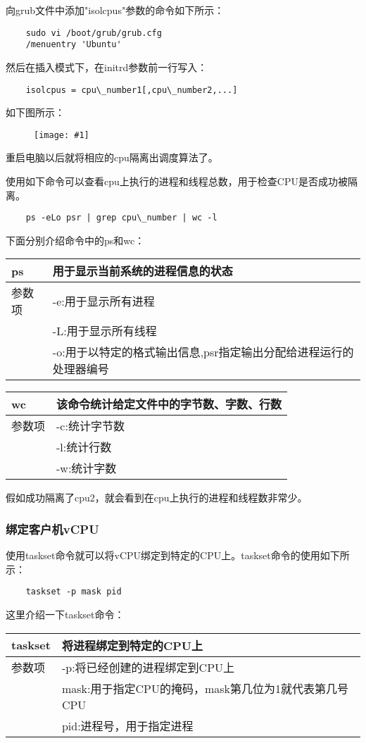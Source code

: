 \documentclass[a4paper,left=2.5cm,right=2.5cm,11pt]{article}
\newcommand{\fic}[1]{\begin{figure}[H]
		\center
		\texttt{[image: \#1]}
	\end{figure}}
\newcommand{\interval}{\vspace{0.5em}}
\newcommand{\tablestart}{
	\interval
	\begin{longtable}{p{2cm}p{10cm}}
	\hline}
\newcommand{\tableend}{
	\hline
	\end{longtable}
	\interval}
\begin{document}
	向grub文件中添加"isolcpus"参数的命令如下所示：
	\begin{lstlisting}
	sudo vi /boot/grub/grub.cfg
	/menuentry 'Ubuntu'
	\end{lstlisting}
	
	然后在插入模式下，在initrd参数前一行写入：
	\begin{lstlisting}
	isolcpus = cpu\_number1[,cpu\_number2,...]
	\end{lstlisting}

	如下图所示：
	\fic{2.png}

	重启电脑以后就将相应的cpu隔离出调度算法了。\par

	使用如下命令可以查看cpu上执行的进程和线程总数，用于检查CPU是否成功被隔离。

	\begin{lstlisting}
	ps -eLo psr | grep cpu\_number | wc -l
	\end{lstlisting}

	下面分别介绍命令中的ps和wc：
	\tablestart
	ps & 用于显示当前系统的进程信息的状态\\
	\hline
	参数项 & -e:用于显示所有进程 \\
		& -L:用于显示所有线程 \\
		& -o:用于以特定的格式输出信息,psr指定输出分配给进程运行的处理器编号 \\
	\tableend

	\tablestart
	wc & 该命令统计给定文件中的字节数、字数、行数 \\
	\hline
	参数项 & -c:统计字节数 \\
		  & -l:统计行数 \\
		  & -w:统计字数 \\
	\tableend

	假如成功隔离了cpu2，就会看到在cpu上执行的进程和线程数非常少。
	
\subsubsection{绑定客户机vCPU}
	使用taskset命令就可以将vCPU绑定到特定的CPU上。taskset命令的使用如下所示：
	\begin{lstlisting}
	taskset -p mask pid
	\end{lstlisting}

	这里介绍一下taskset命令：
	\tablestart
	taskset & 将进程绑定到特定的CPU上 \\
	\hline
	参数项 & -p:将已经创建的进程绑定到CPU上 \\
		 & mask:用于指定CPU的掩码，mask第几位为1就代表第几号CPU \\
		 & pid:进程号，用于指定进程 \\
	\tableend
\end{document}
